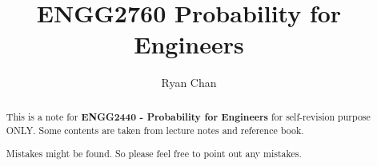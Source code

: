 \documentclass[a4paper]{report}
\author{Ryan Chan}
\title{ENGG2760 Probability for Engineers}
\begin{document}
\setlength\parindent{0pt}


\maketitle

\newpage

\begin{abstract}
	This is a note for \textbf{ENGG2440 - Probability for Engineers} for self-revision purpose ONLY. Some contents are taken from lecture notes and reference book. 
	
	Mistakes might be found. So please feel free to point out any mistakes.
\end{abstract}

\newpage

\tableofcontents

\setlength{\parskip}{5pt}
\end{document}
